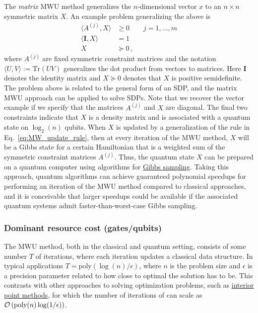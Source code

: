 \begin{refsection}
The \textit{matrix} MWU method generalizes the $n$-dimensional vector $x$ to an $n \times n$ symmetric matrix $X$. An example problem generalizing the above is
\begin{align}
    \langle A^{(j)}, X \rangle &\geq 0 \qquad j = 1,\ldots,m \\
    \langle \mathbf{I}, X \rangle &= 1 \\
    X &\succeq 0\,,
\end{align}
where $A^{(j)}$ are fixed symmetric constraint matrices and the notation $\langle U, V\rangle := \text{Tr}(UV)$ generalizes the dot product from vectors to matrices. 
Here $\mathbf{I}$ denotes the identity matrix and $X \succeq 0$ denotes that $X$ is positive semidefinite. The problem above is related to the general form of an SDP, and the matrix MWU approach can be applied to solve SDPs. Note that we recover the vector example if we specify that the matrices $A^{(j)}$ and $X$ are diagonal. The final two constraints indicate that $X$ is a density matrix and is associated with a quantum state on $\log_2(n)$ qubits. When $X$ is updated by a generalization of the rule in Eq.~\eqref{eq:MW_update_rule}, then at every iteration of the MWU method, $X$ will be a Gibbs state for a certain Hamiltonian that is a weighted sum of the symmetric constraint matrices $A^{(j)}$. Thus, the quantum state $X$ can be prepared on a quantum computer using algorithms for \hyperref[prim:GibbsSampling]{Gibbs sampling}. Taking this approach, quantum algorithms can achieve guaranteed polynomial speedups for performing an iteration of the MWU method compared to classical approaches, and it is conceivable that larger speedups could be available if the associated quantum systems admit faster-than-worst-case Gibbs sampling. 


\subsubsection*{Dominant resource cost (gates/qubits)}

The MWU method, both in the classical and quantum setting, consists of some number $T$ of iterations, where each iteration updates a classical data structure. In typical applications $T = \text{poly}(\log(n)/\epsilon)$, where $n$ is the problem size and  $\epsilon$ is a precision parameter related to how close to optimal the solution has to be.  This contrasts with other approaches to solving optimization problems, such as \hyperref[prim:QIPM]{interior point methods}, for which the number of iterations of can scale as $\mathcal{O}\left( \text{poly}(n)\log(1/\epsilon) \right)$.


\end{refsection}
